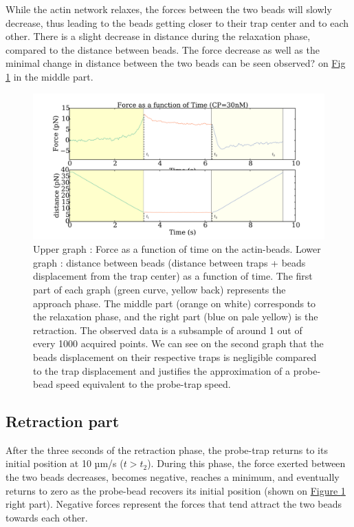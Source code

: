 \documentclass[A4paperpaper,11pt,english]{sphinxmanual}
\begin{document}
While the actin network relaxes, the forces between the two beads will slowly
decrease, thus leading to the beads getting closer to their trap center and
to each other. There is a slight decrease in distance during the relaxation phase, compared to the distance between beads. The force decrease as well as
the minimal change in distance between the two beads can be seen observed? on \hyperref[index-latex:figindent-time]{Fig  \ref*{index-latex:figindent-time}}
in the middle part.
\begin{figure}[htbp]
\centering
\capstart

\includegraphics[width=0.700\linewidth]{force_time.pdf}
\caption{Upper graph : Force as a function of time on the actin-beads.  Lower graph
: distance between beads (distance between traps + beads
displacement from the trap center) as a function of time. The first part of each graph
(green curve, yellow back) represents the approach phase. The middle part
(orange on white) corresponds to the relaxation phase, and the right part (blue on pale
yellow) is the retraction. The observed data is a subsample of around 1 out of every
1000 acquired points. We can see on the second graph that the beads
displacement on their respective traps is negligible compared to the
trap displacement and justifies the approximation of a probe-bead
speed equivalent to the probe-trap speed.}\label{index-latex:figindent-time}\end{figure}


\subsection{Retraction part}
\label{index-latex:retraction-part}
After the three seconds of the retraction phase, the probe-trap returns to
its  initial position at 10 µm/s (\(t > t_2\)). During this phase, the force
exerted between the two beads decreases, becomes negative, reaches a minimum, and
eventually returns to zero as the probe-bead recovers its initial
position (shown on \hyperref[index-latex:figindent-time]{Figure  \ref*{index-latex:figindent-time}} right part). Negative forces
represent the forces that tend attract the two beads towards each other.
\end{document}
